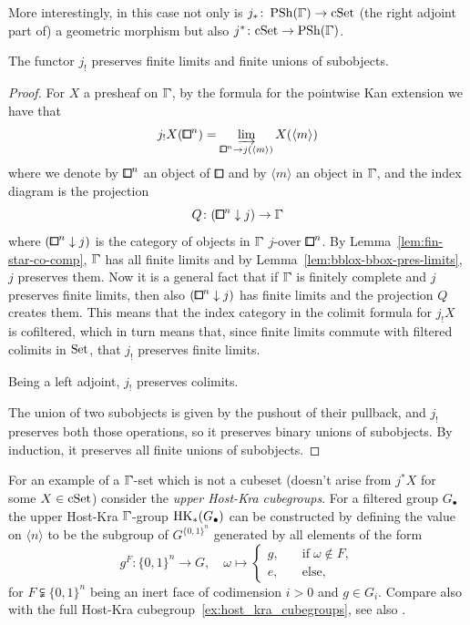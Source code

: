 More interestingly, in this case not only is $j_\ast\colon\PSh(\bbGamma)\to\cSet$
(the right adjoint part of) a geometric morphism but also $j^\ast\colon\cSet\to\PSh(\bbGamma)$.

\begin{lemma}\label{lem:j-geometric-morphism}
The functor $j_!$ preserves finite limits and finite unions of subobjects.
\end{lemma}

\begin{proof}
For $X$ a presheaf on $\bbGamma$, by the formula for the pointwise Kan extension we have that
\[
    j_! X({\bbox}^n) = \varinjlim_{{\bbox}^n\to j(\langle m\rangle)}X(\langle m\rangle)
\]
where we denote by ${\bbox}^n$ an object of $\bbox$ and by $\langle m\rangle$ an object in $\bbGamma$,
and the index diagram is the projection
\[
    Q\colon ({\bbox}^n\downarrow j)\to\bbGamma
\]
where $({\bbox}^n\downarrow j)$ is the category of objects in $\bbGamma$ $j$-over ${\bbox}^n$.
By Lemma~\ref{lem:fin-star-co-comp}, $\bbGamma$ has all finite limits
and by Lemma~\ref{lem:bblox-bbox-pres-limits}, $j$ preserves them.
Now it is a general fact that if $\bbGamma$ is finitely complete and $j$ preserves finite limits,
then also $({\bbox}^n\downarrow j)$ has finite limits and the projection $Q$ creates them.
This means that the index category in the colimit formula for $j_! X$ is cofiltered,
which in turn means that, since finite limits commute with filtered colimits in $\mathrm{Set}$,
that $j_!$ preserves finite limits.

Being a left adjoint, $j_!$ preserves colimits.

The union of two subobjects is given by the pushout of their pullback,
and $j_!$ preserves both those operations, so it preserves binary unions of subobjects.
By induction, it preserves all finite unions of subobjects.
\end{proof}

\begin{remark}
For an example of a $\bbGamma$-set which is not a cubeset (doesn't arise from $j^\ast X$ for some $X\in\mathrm{cSet}$)
consider the \emph{upper Host-Kra cubegroups}.
For a filtered group $G_\bullet$ the upper Host-Kra $\bbGamma$-group $\operatorname{HK}_*(G_\bullet)$ can be constructed
by defining the value on $\langle n\rangle $ to be the subgroup of $G^{\{0,1\}^n}$ generated by all elements of the form
\[
    g^F\colon\{0,1\}^n\to G,\quad \omega\mapsto \begin{cases}
        g,\quad & \text{if}\;\omega\notin F, \\
        e,\quad & \text{else},
    \end{cases}
\]
for $F\subsetneqq \{0,1\}^n$ being an inert face of codimension $i>0$ and $g\in G_i$.
Compare also with the full Host-Kra cubegroup~\ref{ex:host_kra_cubegroups},
see also \cite{Bihlmaier2026b}.
\end{remark}

